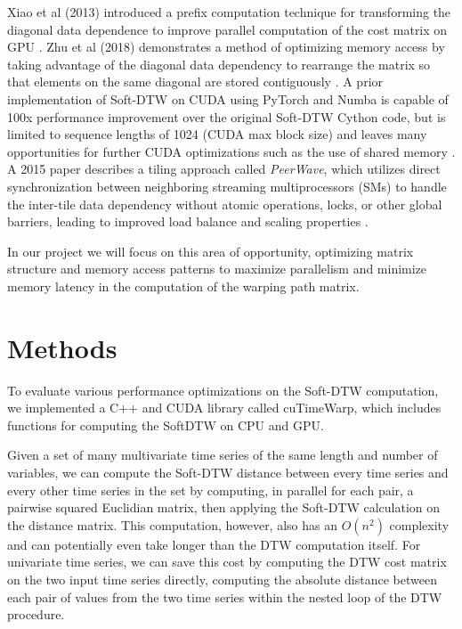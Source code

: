 \documentclass[12pt, letterpaper]{article}
\begin{document}
Xiao et al (2013) introduced a prefix computation technique for transforming the
diagonal data dependence to improve parallel computation of the cost matrix on
GPU \cite{xiao_parallelizing_2013}. Zhu et al (2018) demonstrates a method of
optimizing  memory access by taking advantage of the diagonal data dependency to
rearrange the matrix so that elements on the same diagonal are stored
contiguously \cite{zhu_developing_2018}. A prior implementation of Soft-DTW on
CUDA using PyTorch and Numba is capable of 100x performance improvement over the
original Soft-DTW Cython code, but is limited to sequence lengths of 1024 (CUDA
max block size) and leaves many opportunities for further CUDA optimizations
such as the use of shared memory \cite{maghoumi_pytorch-softdtw-cuda_2021}. A
2015 paper describes a tiling approach called \emph{PeerWave}, which utilizes
direct synchronization between neighboring streaming multiprocessors (SMs) to
handle the inter-tile data dependency without atomic operations, locks, or other
global barriers, leading to improved load balance and scaling properties
\cite{belviranli_peerwave_2015}.

In our project we will focus on this area of opportunity, optimizing matrix
structure and memory access patterns to maximize parallelism and minimize memory
latency in the computation of the warping path matrix.

\section{Methods}

To evaluate various performance optimizations on the Soft-DTW computation, we
implemented a C++ and CUDA library called cuTimeWarp, which includes functions 
for computing the SoftDTW on CPU and GPU.

Given a set of many multivariate time series of the same length and number of
variables, we can compute the Soft-DTW distance between every time series and
every other time series in the set by computing, in parallel for each pair, a
pairwise squared Euclidian matrix, then applying the Soft-DTW calculation on the
distance matrix. This computation, however, also has an $O(n^2)$ complexity and
can potentially even take longer than the DTW computation itself. For univariate
time series, we can save this cost by computing the DTW cost matrix on the two
input time series directly, computing the absolute distance between each pair of
values from the two time series within the nested loop of the DTW procedure.
\end{document}
